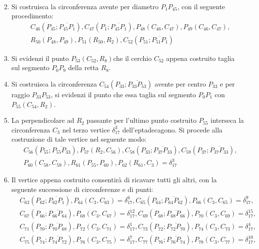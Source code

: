 \begin{enumerate}
\begin{align*}
\end{align*}
\item Si costruisca la circonferenza avente per diametro $P_{1}P_{45}$, con il seguente procedimento:
\begin{align*}
& C_{46}(P_{45};\overline{P_{45} P_{1}}), C_{47}(P_{1};\overline{P_{45} P_{1}}), P_{48}(C_{46}, C_{47}), P_{49}(C_{46}, C_{47}), \\
& R_{50}(P_{48}, P_{49}), P_{51}(R_{50}, R_{2}), C_{52}(P_{51};\overline{P_{51} P_{1}})
\end{align*}
\item Si evidenzi il punto $P_{53}(C_{52}, R_{8})$che il cerchio $C_{52}$ appena costruito taglia sul segmento $P_{0}P_{9}$ della retta $R_{8}$.
\item Si costruisca la circonferenza $C_{54}(P_{33};\overline{P_{33} P_{53}})$ avente per centro $P_{33}$ e per raggio $P_{33}P_{53}$, si evidenzi il punto che essa taglia sul segmento $P_{0}P_{1}$ con $P_{55}(C_{54}, R_{2})$.
\item La perpendicolare ad $R_{2}$ passante per l'ultimo punto costruito $P_{55}$ interseca la circonferenza $C_{3}$ nel terzo vertice $\delta_{17}^{3}$ dell'eptadecagono. Si procede alla costruzione di tale vertice nel seguente modo: 
\begin{align*}
& C_{56}(P_{55};\overline{P_{55} P_{33}}), P_{57}(R_{2},C_{56}), C_{58}(P_{33};\overline{P_{37} P_{33}}), C_{59}(P_{37};\overline{P_{37} P_{33}}), \\ 
& P_{60}(C_{58},C_{59}), R_{61}(P_{55},P_{60}), P_{62}(R_{61}, C_{3}) = \delta_{17}^{3}
\end{align*}
\item Il vertice appena costruito consentirà di ricavare tutti gli altri, con la seguente successione di circonferenze e di punti:
\begin{align*}
&C_{63}(P_{62};\overline{P_{62} P_{1}}), P_{64}(C_{3}, C_{63}) = \delta_{17}^{6}, C_{65}(P_{64};\overline{P_{64} P_{62}}), P_{66}(C_{3}, C_{65}) = \delta_{17}^{9},\\
&C_{67}(P_{66};\overline{P_{66} P_{64}}), P_{68}(C_{3}, C_{67})= \delta_{17}^{12}, C_{69}(P_{68};\overline{P_{68} P_{66}}), P_{70}(C_{3}, C_{69})= \delta_{17}^{15},\\
&C_{71}(P_{70};\overline{P_{70} P_{68}}), P_{72}(C_{3}, C_{71}) = \delta_{17}^{1}, C_{73}(P_{72};\overline{P_{72} P_{70}}), P_{74}(C_{3}, C_{73})= \delta_{17}^{4},\\
&C_{75}(P_{74};\overline{P_{74} P_{72}}), P_{76}(C_{3}, C_{75})= \delta_{17}^{7}, C_{77}(P_{76};\overline{P_{76} P_{74}}), P_{78}(C_{3}, C_{77})= \delta_{17}^{10},\\

\end{align*}
\end{enumerate}
